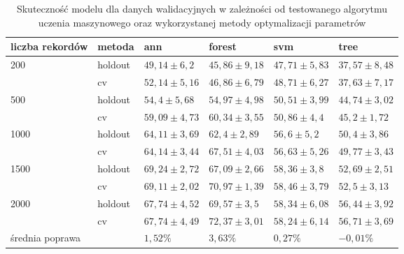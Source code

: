 \begin{table}[]
\centering
\begin{tabular}{|l|l|l|l|l|l|}
\hline
liczba rekordów       & metoda   & ann & forest & svm & tree \\ \hline
\multirow{2}{*}{200}     & holdout    & $ 49,14 \pm 6,2$ & $45,86 \pm 9,18$ & $47,71 \pm 5,83$ & $37,57 \pm 8,48$ \\ \cline{2-6} 
                         & cv         & $52,14 \pm 5,16$ & $46,86 \pm 6,79$ & $48,71 \pm 6,27$ & $37,63 \pm 7,17$ \\ \hline
\multirow{2}{*}{500}     & holdout    & $54,4 \pm 5,68$ & $54,97 \pm 4,98$ & $50,51 \pm 3,99$ & $44,74 \pm 3,02$ \\ \cline{2-6} 
                         & cv         & $59,09 \pm 4,73$ & $60,34 \pm 3,55$ & $50,86 \pm 4,4$ & $45,2 \pm 1,72$ \\ \hline
\multirow{2}{*}{1000}    & holdout    & $64,11 \pm 3,69$ & $62,4 \pm 2,89$ & $56,6 \pm 5,2$ & $50,4 \pm 3,86$ \\ \cline{2-6} 
                         & cv         & $64,14 \pm 3,44$ & $67,51 \pm 4,03$ & $56,63 \pm 5,26$ & $49,77 \pm 3,43$ \\\hline
\multirow{2}{*}{1500}    & holdout    &$ 69,24 \pm 2,72$ & $67,09 \pm 2,66$ & $58,36 \pm 3,8$ & $52,69 \pm 2,51$ \\ \cline{2-6} 
                         & cv         & $69,11 \pm 2,02$ & $70,97 \pm 1,39$ & $58,46 \pm 3,79$ & $52,5 \pm 3,13$ \\ \hline
\multirow{2}{*}{2000}    & holdout    & $67,74 \pm 4,52$ & $69,57 \pm 3,5$ & $58,34 \pm 6,08$ & $56,44 \pm 3,92$ \\ \cline{2-6} 
                                          & cv         & $67,74 \pm 4,49$ & $72,37 \pm 3,01$ & $58,24 \pm 6,14$ & $56,71 \pm 3,69$ \\ \hline
                                                                                    
\multicolumn{2}{|l|}{średnia poprawa}   &  $1,52 \%$    &  $3,63 \%$      &  $0,27 \%$   &  $-0,01 \%$   \\ \hline

\end{tabular}
\caption{Skuteczność modelu dla danych walidacyjnych w zależności od testowanego algorytmu uczenia maszynowego oraz wykorzystanej metody optymalizacji parametrów} \label{table:cv}
\end{table}

